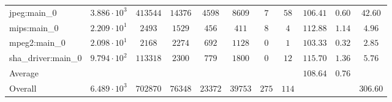 \begin{tabular}{|l|c|c|c|c|c|c|c|c|c|c|}
jpeg:main\_0            & $ 3.886 \cdot 10^{3}  $ & $ 413544 $ & $ 14376 $ & $ 4598  $ & $ 8609  $ & $ 7   $ & $ 58  $ & $ 106.41      $ & $ 0.60    $ & $ 42.60   $ \\
mips:main\_0            & $ 2.209 \cdot 10^{1}  $ & $ 2493   $ & $ 1529  $ & $ 456   $ & $ 411   $ & $ 8   $ & $ 4   $ & $ 112.88      $ & $ 1.14    $ & $ 4.96    $ \\
mpeg2:main\_0           & $ 2.098 \cdot 10^{1}  $ & $ 2168   $ & $ 2274  $ & $ 692   $ & $ 1128  $ & $ 0   $ & $ 1   $ & $ 103.33      $ & $ 0.32    $ & $ 2.85    $ \\
sha\_driver:main\_0     & $ 9.794 \cdot 10^{2}  $ & $ 113318 $ & $ 2300  $ & $ 779   $ & $ 1800  $ & $ 0   $ & $ 12  $ & $ 115.70      $ & $ 1.36    $ & $ 5.76    $ \\
\hline
Average                 & $                     $ & $        $ & $       $ & $       $ & $       $ & $     $ & $     $ & $ 108.64      $ & $ 0.76    $ & $         $ \\
\hline
Overall                 & $ 6.489 \cdot 10^{3}  $ & $ 702870 $ & $ 76348 $ & $ 23372 $ & $ 39753 $ & $ 275 $ & $ 114 $ & $             $ & $         $ & $ 306.60  $ \\
\hline
\end{tabular}
